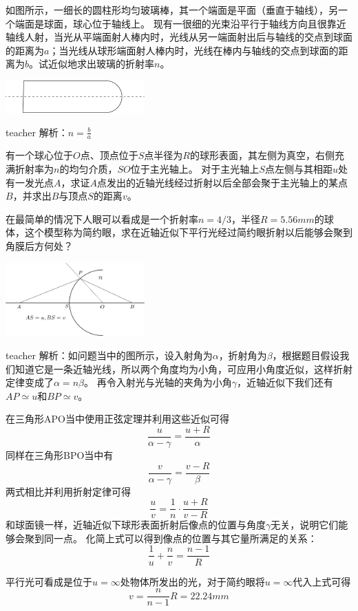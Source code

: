 \begin{example}
	如图所示，一细长的圆柱形均匀玻璃棒，其一个端面是平面（垂直于轴线），另一个端面是球面，球心位于轴线上。
	现有一很细的光束沿平行于轴线方向且很靠近轴线人射，当光从平端面射人棒内时，光线从另一端面射出后与轴线的交点到球面的距离为$ a$；当光线从球形端面射人棒内时，光线在棒内与轴线的交点到球面的距离为$b$。试近似地求出玻璃的折射率$ n$。
	\begin{flushright}
		\includegraphics[width = 0.4\textwidth]{images/opt-9.pdf} 
	\end{flushright}
	\begin{taggedblock}{teacher}
		\noindent
		解析：$n=\frac{b}{a}$
	\end{taggedblock}
\end{example}

\begin{example}
有一个球心位于$O$点、顶点位于$S$点半径为$R$的球形表面，其左侧为真空，右侧充满折射率为$n$的均匀介质，$SO$位于主光轴上。
对于主光轴上$S$点左侧与其相距$u$处有一发光点$A$，求证$A$点发出的近轴光线经过折射以后全部会聚于主光轴上的某点$B$，并求出$B$与顶点$S$的距离$v$。

在最简单的情况下人眼可以看成是一个折射率$n=4/3$，半径$R=5.56\unit{mm}$的球体，这个模型称为简约眼，求在近轴近似下平行光经过简约眼折射以后能够会聚到角膜后方何处？
\begin{flushright}
\includegraphics[width = 0.4\textwidth]{images/sphrical-lense.pdf}
\end{flushright}
\begin{taggedblock}{teacher}
\noindent
解析：如问题当中的图所示，设入射角为$\alpha$，折射角为$\beta$，根据题目假设我们知道它是一条近轴光线，所以两个角度均为小角，可应用小角度近似，这样折射定律变成了$\alpha=n\beta$。
再令入射光与光轴的夹角为小角$\gamma$，近轴近似下我们还有$AP\simeq u$和$BP\simeq v$。

在三角形APO当中使用正弦定理并利用这些近似可得
\[
\frac{u}{\alpha-\gamma}=\frac{u+R}{\alpha}
\]
同样在三角形BPO当中有
\[
\frac{v}{\alpha-\gamma}=\frac{v-R}{\beta}
\]
两式相比并利用折射定律可得
\[  \frac{u}{v}=\frac{1}{n}\cdot\frac{u+R}{v-R}\]
和球面镜一样，近轴近似下球形表面折射后像点的位置与角度$\gamma$无关，说明它们能够会聚到同一点。
化简上式可以得到像点的位置与其它量所满足的关系：
\[
\frac{1}{u}+\frac{n}{v}=\frac{n-1}{R}
\]

平行光可看成是位于$u=\infty$处物体所发出的光，对于简约眼将$u=\infty$代入上式可得
\[
v=\frac{n}{n-1}R=22.24\unit{mm}
\]
\end{taggedblock}
\end{example}



